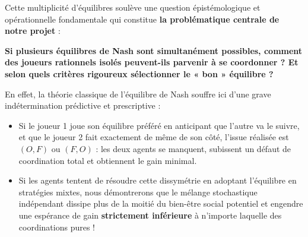 \documentclass[11pt,a4paper]{article}
\begin{document}
Cette multiplicité d'équilibres soulève une question épistémologique et opérationnelle fondamentale qui constitue \textbf{la problématique centrale de notre projet} :
\begin{center}
\begin{tcolorbox}[colback=red!3!white,colframe=red!70!black,width=0.96\linewidth,boxrule=0.9pt]
\centering \large \bfseries
Si plusieurs équilibres de Nash sont simultanément possibles, comment des joueurs rationnels isolés peuvent-ils parvenir à se coordonner ? Et selon quels critères rigoureux sélectionner le « bon » équilibre ?
\end{tcolorbox}
\end{center}

En effet, la théorie classique de l'équilibre de Nash souffre ici d'une grave indétermination prédictive et prescriptive :
\begin{itemize}[leftmargin=1.5em]
    \item Si le joueur 1 joue son équilibre préféré en anticipant que l'autre va le suivre, et que le joueur 2 fait exactement de même de son côté, l'issue réalisée est $(O, F)$ ou $(F, O)$ : les deux agents se manquent, subissent un défaut de coordination total et obtiennent le gain minimal.
    \item Si les agents tentent de résoudre cette dissymétrie en adoptant l'équilibre en stratégies mixtes, nous démontrerons que le mélange stochastique indépendant dissipe plus de la moitié du bien-être social potentiel et engendre une espérance de gain \textbf{strictement inférieure} à n'importe laquelle des coordinations pures !
\end{itemize}
\end{document}
